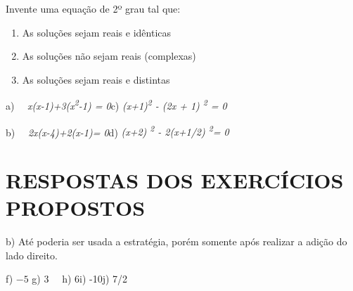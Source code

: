 \begin{exercicios}
	\item{ Invente uma equação de 2º grau tal que:}

\begin{enumerate}[label=\alph*)]
	\item As soluções sejam reais e idênticas

	\item As soluções não sejam reais (complexas)

	\item As soluções sejam reais e distintas
\end{enumerate}


a)~~ \textit{x(x-1)+3(x\textsuperscript{2}-1) = 0\quad \quad }\quad c)  \textit{(x+1)\textsuperscript{2} - (2x + 1)\textsuperscript{ 2} = 0}

b)~~ \textit{2x(x-4)+2(x-1)= 0\quad \quad }\quad d) \textit{(x+2)\textsuperscript{ 2} - 2(x+1/2)\textsuperscript{ 2}= 0}

\end{exercicios}

\section{RESPOSTAS DOS EXERCÍCIOS PROPOSTOS}

\begin{respostas}{3}

	b) Até poderia ser usada a estratégia, porém somente após realizar a adição do lado direito.



    f)  \( -5 \) \quad \quad g) 3\quad ~~ h) 6\quad \quad i) -10\quad \quad j) 7/2\quad







\end{respostas}

